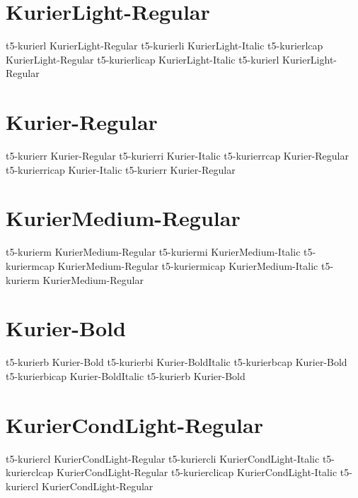 \documentclass[sample]{vnsample}
\begin{document}
\section{KurierLight-Regular}
      {t5-kurierl}      {KurierLight-Regular}
     {t5-kurierli}     {KurierLight-Italic}
     {t5-kurierlcap}   {KurierLight-Regular}
   {t5-kurierlicap}  {KurierLight-Italic}
      {t5-kurierl}      {KurierLight-Regular}

\section{Kurier-Regular}
      {t5-kurierr}      {Kurier-Regular}
     {t5-kurierri}     {Kurier-Italic}
     {t5-kurierrcap}   {Kurier-Regular}
   {t5-kurierricap}  {Kurier-Italic}
      {t5-kurierr}      {Kurier-Regular}

\section{KurierMedium-Regular}
     {t5-kurierm}      {KurierMedium-Regular}
    {t5-kuriermi}     {KurierMedium-Italic}
    {t5-kuriermcap}   {KurierMedium-Regular}
  {t5-kuriermicap}  {KurierMedium-Italic}
     {t5-kurierm}      {KurierMedium-Regular}

\section{Kurier-Bold}
      {t5-kurierb}      {Kurier-Bold}
     {t5-kurierbi}     {Kurier-BoldItalic}
     {t5-kurierbcap}   {Kurier-Bold}
   {t5-kurierbicap}  {Kurier-BoldItalic}
      {t5-kurierb}      {Kurier-Bold}

\section{KurierCondLight-Regular}
     {t5-kuriercl}     {KurierCondLight-Regular}
    {t5-kuriercli}    {KurierCondLight-Italic}
    {t5-kurierclcap}  {KurierCondLight-Regular}
  {t5-kurierclicap} {KurierCondLight-Italic}
     {t5-kuriercl}     {KurierCondLight-Regular}
\end{document}
